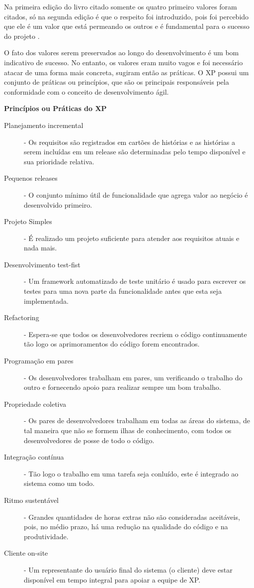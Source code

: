 \documentclass[
	article,			%
	11pt,				%
	oneside,			%
	a4paper,			%
	english,			%
	brazil,				%
	sumario=tradicional
	]{abntex2}
\begin{document}
Na primeira edição do livro citado somente os quatro primeiro valores foram
citados, só na segunda edição é que o respeito foi introduzido, pois foi
percebido que ele é um valor que está permeando os outros e é fundamental para
o sucesso do projeto \cite{beck2000extreme}.

O fato dos valores serem preservados ao longo do desenvolvimento é um bom
indicativo de sucesso. No entanto, os valores eram muito vagos e foi necessário
atacar de uma forma mais concreta, sugiram então as práticas. O XP possui um
conjunto de práticas ou princípios, que são os principais responsáveis pela
conformidade com o conceito de desenvolvimento ágil.

\textbf{Princípios ou Práticas do XP}

\begin{description}
   \item[Planejamento incremental] - Os requisitos são registrados em cartões de
   histórias e as histórias a serem incluídas em um release são determinadas
   pelo tempo disponível e sua prioridade relativa.
   \item[Pequenos releases] - O conjunto mínimo útil de funcionalidade que
   agrega valor ao negócio é desenvolvido primeiro.
   \item[Projeto Simples] - É realizado um projeto suficiente para atender aos
   requisitos atuais e nada mais.
   \item[Desenvolvimento test-fist] - Um framework automatizado de teste
   unitário é usado para escrever os testes para uma nova parte da
   funcionalidade antes que esta seja implementada.
   \item[Refactoring] - Espera-se que todos os desenvolvedores recriem o código
   continuamente tão logo os aprimoramentos do código forem encontrados.
   \item[Programação em pares] - Os desenvolvedores trabalham em pares, um
   verificando o trabalho do outro e fornecendo apoio para realizar sempre um
   bom trabalho.
   \item[Propriedade coletiva] - Os pares de desenvolvedores trabalham em todas
   as áreas do sistema, de tal maneira que não se formem ilhas de conhecimento,
   com todos os desenvolvedores de posse de todo o código.
   \item[Integração contínua] - Tão logo o trabalho em uma tarefa seja conluído,
   este é integrado ao sistema como um todo.
   \item[Ritmo sustentável] - Grandes quantidades de horas extras não são
   consideradas aceitáveis, pois, no médio prazo, há uma redução na qualidade do
   código e na produtividade.
   \item[Cliente on-site] - Um representante do usuário final do sistema (o
   cliente) deve estar disponível em tempo integral para apoiar a equipe de XP.
\end{description}
\end{document}
